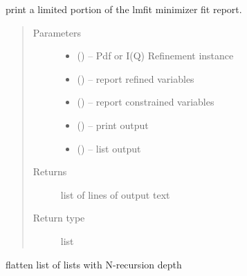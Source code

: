 \documentclass[letterpaper,10pt,english]{sphinxmanual}
\begin{document}
\begin{fulllineitems}
\label{\detokenize{rst/utilities:mstack.utilities.filter_report}}
print a limited portion of the lmfit minimizer fit report.
\begin{quote}\begin{description}
\item[{Parameters}] \leavevmode\begin{itemize}
\item {} 
 () -- Pdf or I(Q) Refinement instance

\item {} 
 () -- report refined variables

\item {} 
 () -- report constrained variables

\item {} 
 () -- print output

\item {} 
 () -- list output

\end{itemize}

\item[{Returns}] \leavevmode
list of lines of output text

\item[{Return type}] \leavevmode
list

\end{description}\end{quote}

\end{fulllineitems}


\begin{fulllineitems}
\label{\detokenize{rst/utilities:mstack.utilities.flatten}}
flatten list of lists with N-recursion depth

\end{fulllineitems}
\end{document}
